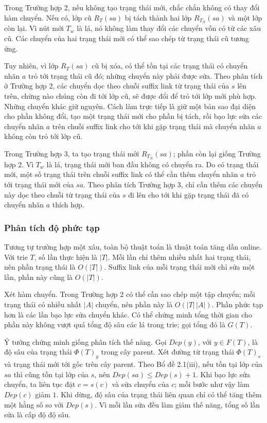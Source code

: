 \documentclass[11pt]{article}
\begin{document}
Trong Trường hợp 2, nếu không tạo trạng thái mới, chắc chắn không có thay đổi
hàm chuyển. Nếu có, lớp cũ \(R_T(sa)\) bị tách thành hai lớp \(R_{T_N}(sa)\) và
một lớp còn lại. Vì nút mới \(T_w\) là lá, nó không làm thay đổi các chuyển vốn
có từ các xâu cũ. Các chuyển của hai trạng thái mới có thể sao chép từ trạng
thái cũ tương ứng.

Tuy nhiên, vì lớp \(R_T(sa)\) cũ bị xóa, có thể tồn tại các trạng thái có chuyển
nhãn \(a\) trỏ tới trạng thái cũ đó; những chuyển này phải được sửa. Theo phân
tích ở Trường hợp 2, các chuyển dọc theo chuỗi suffix link từ trạng thái của
\(s\) lên trên, chừng nào chúng còn đi tới lớp cũ, sẽ được đổi để trỏ tới lớp
mới phù hợp. Những chuyển khác giữ nguyên. Cách làm trực tiếp là giữ một bản
sao đại diện cho phần không đổi, tạo một trạng thái mới cho phần bị tách, rồi
bạo lực sửa các chuyển nhãn \(a\) trên chuỗi suffix link cho tới khi gặp trạng
thái mà chuyển nhãn \(a\) không còn trỏ tới lớp cũ.

Trong Trường hợp 3, ta tạo trạng thái mới \(R_{T_N}(sa)\); phần còn lại giống
Trường hợp 2. Vì \(T_w\) là lá, trạng thái mới ban đầu không có chuyển ra. Do có
trạng thái mới, một số trạng thái trên chuỗi suffix link có thể cần thêm chuyển
nhãn \(a\) trỏ tới trạng thái mới của \(sa\). Theo phân tích Trường hợp 3, chỉ
cần thêm các chuyển này dọc theo chuỗi từ trạng thái của \(s\) đi lên cho tới
khi gặp trạng thái đã có chuyển nhãn \(a\) thích hợp.

\subsubsection{Phân tích độ phức tạp}

Tương tự trường hợp một xâu, toàn bộ thuật toán là thuật toán tăng dần online.
Với trie \(T\), số lần thực hiện là \(|T|\). Mỗi lần chỉ thêm nhiều nhất hai
trạng thái, nên phần trạng thái là \(O(|T|)\). Suffix link của mỗi trạng thái
mới chỉ sửa một lần, phần này cũng là \(O(|T|)\).

Xét hàm chuyển. Trong Trường hợp 2 có thể cần sao chép một tập chuyển; mỗi trạng
thái có nhiều nhất \(|A|\) chuyển, nên phần này là \(O(|T|\,|A|)\). Phần phức
tạp hơn là các lần bạo lực sửa chuyển khác. Có thể chứng minh tổng thời gian
cho phần này không vượt quá tổng độ sâu các lá trong trie; gọi tổng đó là
\(G(T)\).

Ý tưởng chứng minh giống phân tích thế năng. Gọi \(Dep(y)\), với \(y\in F(T)\),
là độ sâu của trạng thái \(\Phi(T)_y\) trong cây parent. Xét đường từ trạng thái
\(\Phi(T)_s\) và trạng thái mới tới gốc trên cây parent. Theo Bổ đề 2.1(iii),
nếu tồn tại lớp của \(sa\) thì cũng tồn tại lớp của \(s\), nên
\(Dep(sa)\le Dep(s)+1\). Khi bạo lực sửa chuyển, ta liên tục đặt
\(c=s(c)\) và sửa chuyển của \(c\); mỗi bước như vậy làm \(Dep(c)\) giảm \(1\).
Khi dừng, độ sâu của trạng thái liên quan chỉ có thể tăng thêm một hằng số so
với \(Dep(s)\). Vì mỗi lần sửa đều làm giảm thế năng, tổng số lần sửa là cấp độ
độ sâu.
\end{document}
